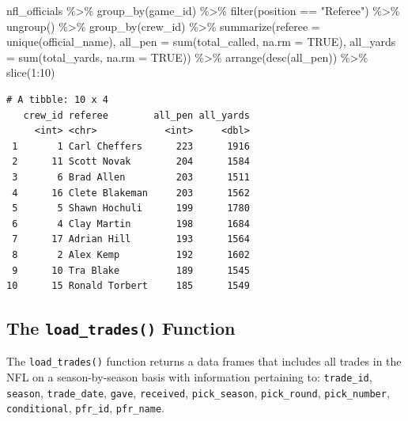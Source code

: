 \documentclass[
  letterpaper,
]{krantz}
\newenvironment{Shaded}{\begin{snugshade}}{\end{snugshade}}
\newcommand{\AttributeTok}[1]{\textcolor[rgb]{0.40,0.45,0.13}{#1}}
\newcommand{\ConstantTok}[1]{\textcolor[rgb]{0.56,0.35,0.01}{#1}}
\newcommand{\DecValTok}[1]{\textcolor[rgb]{0.68,0.00,0.00}{#1}}
\newcommand{\FunctionTok}[1]{\textcolor[rgb]{0.28,0.35,0.67}{#1}}
\newcommand{\NormalTok}[1]{\textcolor[rgb]{0.00,0.23,0.31}{#1}}
\newcommand{\SpecialCharTok}[1]{\textcolor[rgb]{0.37,0.37,0.37}{#1}}
\newcommand{\StringTok}[1]{\textcolor[rgb]{0.13,0.47,0.30}{#1}}
\begin{document}
\begin{Shaded}
\begin{Highlighting}[]
\NormalTok{nfl\_officials }\SpecialCharTok{\%\textgreater{}\%}
  \FunctionTok{group\_by}\NormalTok{(game\_id) }\SpecialCharTok{\%\textgreater{}\%}
  \FunctionTok{filter}\NormalTok{(position }\SpecialCharTok{==} \StringTok{"Referee"}\NormalTok{) }\SpecialCharTok{\%\textgreater{}\%}
  \FunctionTok{ungroup}\NormalTok{() }\SpecialCharTok{\%\textgreater{}\%}
  \FunctionTok{group\_by}\NormalTok{(crew\_id) }\SpecialCharTok{\%\textgreater{}\%}
  \FunctionTok{summarize}\NormalTok{(}\AttributeTok{referee =} \FunctionTok{unique}\NormalTok{(official\_name),}
            \AttributeTok{all\_pen =} \FunctionTok{sum}\NormalTok{(total\_called, }\AttributeTok{na.rm =} \ConstantTok{TRUE}\NormalTok{),}
            \AttributeTok{all\_yards =} \FunctionTok{sum}\NormalTok{(total\_yards, }\AttributeTok{na.rm =} \ConstantTok{TRUE}\NormalTok{)) }\SpecialCharTok{\%\textgreater{}\%}
  \FunctionTok{arrange}\NormalTok{(}\FunctionTok{desc}\NormalTok{(all\_pen)) }\SpecialCharTok{\%\textgreater{}\%}
  \FunctionTok{slice}\NormalTok{(}\DecValTok{1}\SpecialCharTok{:}\DecValTok{10}\NormalTok{)}
\end{Highlighting}
\end{Shaded}

\begin{verbatim}
# A tibble: 10 x 4
   crew_id referee        all_pen all_yards
     <int> <chr>            <int>     <dbl>
 1       1 Carl Cheffers      223      1916
 2      11 Scott Novak        204      1584
 3       6 Brad Allen         203      1511
 4      16 Clete Blakeman     203      1562
 5       5 Shawn Hochuli      199      1780
 6       4 Clay Martin        198      1684
 7      17 Adrian Hill        193      1564
 8       2 Alex Kemp          192      1602
 9      10 Tra Blake          189      1545
10      15 Ronald Torbert     185      1549
\end{verbatim}

\hypertarget{the-load_trades-function}{%
\subsection{\texorpdfstring{The \texttt{load\_trades()}
Function}{The load\_trades() Function}}\label{the-load_trades-function}}

The \texttt{load\_trades()} function returns a data frames that includes
all trades in the NFL on a season-by-season basis with information
pertaining to: \texttt{trade\_id}, \texttt{season},
\texttt{trade\_date}, \texttt{gave}, \texttt{received},
\texttt{pick\_season}, \texttt{pick\_round}, \texttt{pick\_number},
\texttt{conditional}, \texttt{pfr\_id}, \texttt{pfr\_name}.
\end{document}
